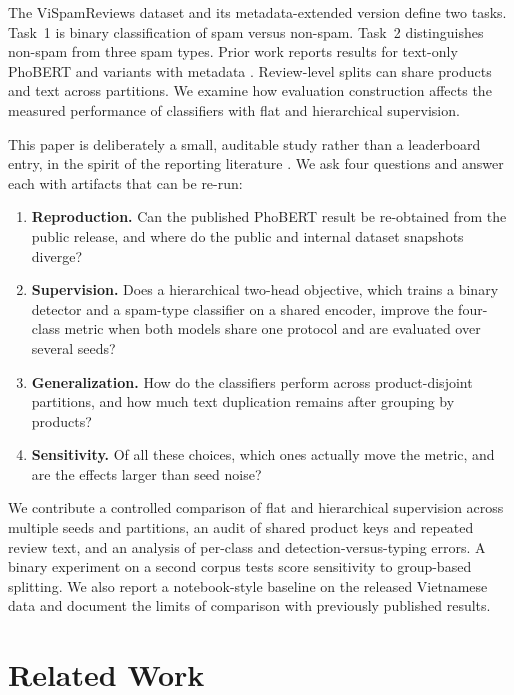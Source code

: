 \documentclass[12pt,a4paper]{article}
\newcommand{\phobert}{PhoBERT}
\newcommand{\vispam}{ViSpamReviews}
\begin{document}
The \vispam{} dataset \cite{vispam2022} and its metadata-extended version \cite{vispam2024} define two tasks. Task~1 is binary classification of spam versus non-spam. Task~2 distinguishes non-spam from three spam types. Prior work reports results for text-only PhoBERT and variants with metadata \cite{vispam2024}. Review-level splits can share products and text across partitions. We examine how evaluation construction affects the measured performance of classifiers with flat and hierarchical supervision.

This paper is deliberately a small, auditable study rather than a leaderboard entry, in the spirit of the reporting literature \cite{reimers2017,dodge2019,bouthillier2021}. We ask four questions and answer each with artifacts that can be re-run:
\begin{enumerate}
\item \textbf{Reproduction.} Can the published \phobert{} result be re-obtained from the public release, and where do the public and internal dataset snapshots diverge?
\item \textbf{Supervision.} Does a hierarchical two-head objective, which trains a binary detector and a spam-type classifier on a shared encoder, improve the four-class metric when both models share one protocol and are evaluated over several seeds?
\item \textbf{Generalization.} How do the classifiers perform across product-disjoint partitions, and how much text duplication remains after grouping by products?
\item \textbf{Sensitivity.} Of all these choices, which ones actually move the metric, and are the effects larger than seed noise?
\end{enumerate}

We contribute a controlled comparison of flat and hierarchical supervision across multiple seeds and partitions, an audit of shared product keys and repeated review text, and an analysis of per-class and detection-versus-typing errors. A binary experiment on a second corpus tests score sensitivity to group-based splitting. We also report a notebook-style baseline on the released Vietnamese data and document the limits of comparison with previously published results.

\section{Related Work}
\end{document}
